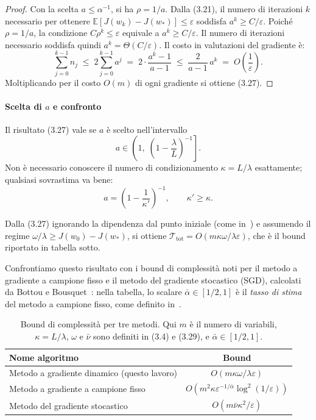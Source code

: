 \documentclass[a4paper,12pt]{article}
\begin{document}
\begin{proof}
Con la scelta \(a \le \alpha^{-1}\), si ha \(\rho = 1/a\). Dalla (3.21), il numero di iterazioni \(k\) necessario per ottenere \(\mathbb{E}[J(w_k) - J(w_*)] \le \varepsilon\) soddisfa \(a^k \ge C/\varepsilon\). Poiché \(\rho = 1/a\), la condizione \(C\rho^k \le \varepsilon\) equivale a \(a^k \ge C/\varepsilon\). Il numero di iterazioni necessario soddisfa quindi \(a^k = \Theta(C/\varepsilon)\). Il costo in valutazioni del gradiente è:
\[
\sum_{j=0}^{k-1} n_j \;\le\; 2\sum_{j=0}^{k-1} a^j
\;=\; 2\cdot \frac{a^k - 1}{a-1}
\;\le\; \frac{2}{a-1}\, a^k
\;=\; O\!\left(\frac{1}{\varepsilon}\right).\]
Moltiplicando per il costo \(O(m)\) di ogni gradiente si ottiene (3.27).
\end{proof}


\paragraph{Scelta di \(a\) e confronto}

Il risultato (3.27) vale se \(a\) è scelto nell'intervallo
\[
a \in \left(1,\; \left(1 - \frac{\lambda}{L}\right)^{-1}\right].
\]
Non è necessario conoscere il numero di condizionamento \(\kappa = L/\lambda\) esattamente; qualsiasi sovrastima va bene:
\[
a = \left(1 - \frac{1}{\kappa'}\right)^{-1}, \qquad \kappa' \ge \kappa. \tag{3.28}
\]

Dalla (3.27) ignorando la dipendenza dal punto iniziale (come in~\cite{bottou2008}) e assumendo il regime $\omega/\lambda \geq J(w_0)-J(w_*)$, si ottiene $\mathcal{T}_{\mathrm{tot}} = O(m\kappa\omega/\lambda\varepsilon)$, che è il bound riportato in tabella sotto.

Confrontiamo questo risultato con i bound di complessità noti per il metodo a gradiente a campione fisso e il metodo del gradiente stocastico (SGD), calcolati da Bottou e Bousquet~\cite{bottou2008}: nella tabella, lo scalare $\bar{\alpha} \in [1/2, 1]$ è il \textit{tasso di stima} del metodo a campione fisso, come definito in~\cite{bottou2008}.
\begin{table}[h]
\centering
\begin{tabular}{|l|c|}
\hline
Nome algoritmo & Bound \\
\hline
Metodo a gradiente dinamico (questo lavoro) & \(O(m\kappa \omega / \lambda \varepsilon)\) \\
Metodo a gradiente a campione fisso & \(O(m^2 \kappa\varepsilon^{-1/\bar{\alpha}} \log^2(1/\varepsilon))\) \\
Metodo del gradiente stocastico & \(O(m\bar{\nu}\kappa^2 / \varepsilon)\) \\
\hline
\end{tabular}
\caption{Bound di complessità per tre metodi. Qui \(m\) è il numero di variabili, \(\kappa = L/\lambda\), \(\omega\) e \(\bar{\nu}\) sono definiti in (3.4) e (3.29), e \(\bar{\alpha} \in [1/2, 1]\).}
\end{table}
\end{document}
